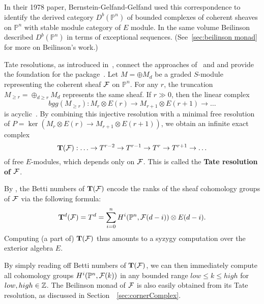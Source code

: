 \documentclass[twoside,12pt, leqno]{amsart}
\def\PP{{\mathbb P}}
\def\bT{{\bf T}}
\def\CU{{\mathcal U}}
\def\daniel#1{{\bf *** Daniel:} #1 {\bf ***}}
\begin{document}
In their 1978 paper, Bernstein-Gelfand-Gelfand \cite{BGG} used this correspondence to identify  the derived category $D^b(\PP^n)$ of bounded complexes of coherent sheaves on $\PP^n$ with stable module category of $E$ module. In the same volume \cite{beilinson} Beilinson  described
$D^b(\PP^n)$ in terms of exceptional sequences.  (See~\ref{sec:beilinson monad} for more on Beilinson's work.)


Tate resolutions, as introduced in~\cite{EFS}, connect the approaches of~\cite{BGG} and \cite{beilinson} and provide the foundation for the package~\cite{M2-BGG}.
Let $M=\oplus M_d$ be a graded $S$-module representing the coherent sheaf ${\mathcal F}$ on $\PP^n$. For any $r$, the truncation $M_{\ge r} = \oplus_{d \ge r}M_d$ represents the same sheaf.  If $r\gg 0$, then the linear complex
$$bgg(M_{\ge r}) : M_r\otimes E(r) \to M_{r+1}\otimes E(r+1) \to \ldots$$ 
is acyclic~\cite[????]{EFS}. By combining this injective resolution with a minimal free resolution of $P=\ker(M_r\otimes E(r) \to M_{r+1}\otimes E(r+1))$, we obtain an infinite exact complex
$$
\bT(\sF):   \ldots \to T^{r-2} \to T^{r-1} \to T^r \to T^{r+1} \to \ldots
$$
of free $E$-modules, which depends only on ${\mathcal F}$.  This is called the {\bf Tate resolution of ${\mathcal F}$}.

By \cite[Theorem x.y] {EFS}, the Betti numbers of $\bT(\sF)$ encode the ranks of the sheaf cohomology groups of ${\mathcal F}$ via the following formula:
$$\bT^d(\sF) =T^d= \sum_{i=0}^n H^i(\PP^n,\sF(d-i)) \otimes E(d-i).$$
Computing (a part of) $\bT(\sF)$ thus amounts to a syzygy computation over the exterior algebra $E$.  

By simply reading off Betti numbers of $\bT(\sF)$, we can then immediately compute all cohomology groups $H^i(\PP^n,\sF(k))$ in any bounded range $low \le k \le high$ for $low,high \in {\mathbb Z}$.  The Beilinson monad of ${\mathcal F}$ is also easily obtained from its Tate resolution, as discussed in Section~~\ref{sec:cornerComplex}.
\end{document}
